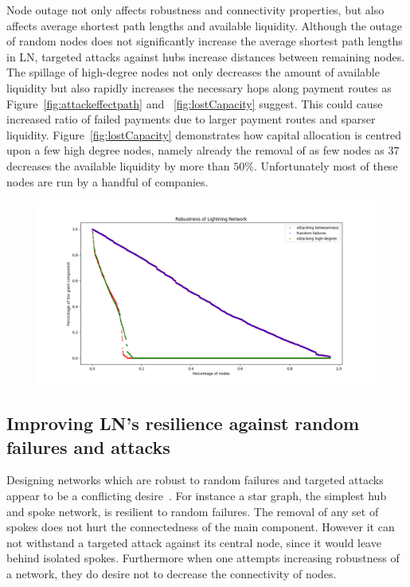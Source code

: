 \documentclass[runningheads]{llncs}
\begin{document}
Node outage not only affects robustness and connectivity properties, but also affects average shortest path lengths and available liquidity. Although the outage of random nodes does not significantly increase the average shortest path lengths in LN, targeted attacks against hubs increase distances between remaining nodes. The spillage of high-degree nodes not only decreases the amount of available liquidity but also rapidly increases the necessary hops along payment routes as Figure~\ref{fig:attackeffectpath} and ~\ref{fig:lostCapacity} suggest. This could cause increased ratio of failed payments due to larger payment routes and sparser liquidity. Figure~\ref{fig:lostCapacity} demonstrates how capital allocation is centred upon a few high degree nodes, namely already the removal of as few nodes as $37$ decreases the available liquidity by more than $50\%$. Unfortunately most of these nodes are run by a handful of companies. 
\begin{figure}[H]
	\centering
	\includegraphics[width=\linewidth]{randomHighBetweenness.png}
	\label{fig:randhighbetween}
\end{figure}

\subsection{Improving LN's resilience against random failures and attacks}
Designing networks which are robust to random failures and targeted attacks appear to be a conflicting desire~\cite{barabasi2016network}. For instance a star graph, the simplest hub and spoke network, is resilient to random failures. The removal of any set of spokes does not hurt the connectedness of the main component. However it can not withstand a targeted attack against its central node, since it would leave behind isolated spokes. Furthermore when one attempts increasing robustness of a network, they do desire not to decrease the connectivity of nodes.
\end{document}
